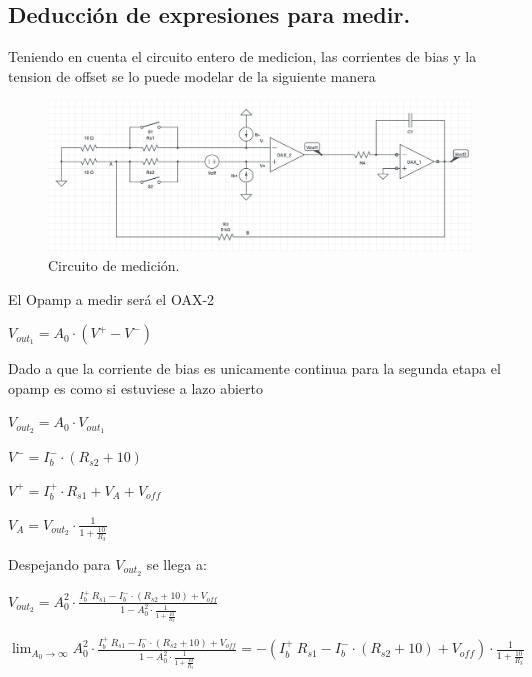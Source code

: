 \documentclass[a4paper]{article}
\begin{document}
\subsection{Deducción de expresiones para medir.}

Teniendo en cuenta el circuito entero de medicion, las corrientes de bias y la tension de offset se lo puede modelar de la siguiente manera
\begin{figure}[H]	
	\centering
	\includegraphics[width=\textwidth]{imagenes/Medicion.PNG}
	\caption{Circuito de medición.}
	\label{fig:Medicion}
\end{figure}
El Opamp a medir será el OAX-2
\begin{center}$V_{out_1}=A_0 \cdot (V^+ - V^-)$\\\end{center}
Dado a que la corriente de bias es unicamente continua para la segunda etapa el opamp es como si estuviese a lazo abierto\\
\begin{center}$V_{out_2}=A_0 \cdot V_{out_1}$\\\end{center}
\begin{center}$V^-=I_b^- \cdot (R_{s2}+10)$\\\end{center}
\begin{center}$V^+=I_b^+ \cdot R_{s1} +V_A+V_{off}$\\\end{center}
\begin{center}$V_A=V_{out_2} \cdot \frac{1}{1+\frac{10}{R_3}}$\\\end{center}
Despejando para $V_{out_2}$ se llega a:
\begin{center}$V_{out_2}=A_0^2  \cdot \frac{I_b^+ \ R_{s1} -I_b^-\cdot (R_{s2}+10)+V_{off}}{1-A_0^2 \cdot \frac{1}{1+\frac{10}{R_3}}}$\\\end{center}
$\lim_{A_0\to\infty} A_0^2  \cdot \frac{I_b^+ \ R_{s1} -I_b^-\cdot (R_{s2}+10)+V_{off}}{1-A_0^2 \cdot \frac{1}{1+\frac{10}{R_3}}}=-(I_b^+ \ R_{s1} -I_b^-\cdot (R_{s2}+10)+V_{off})\cdot \frac{1}{1+\frac{10}{R_3}} $
\end{document}
